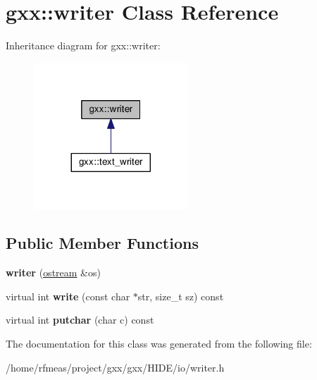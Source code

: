 \hypertarget{classgxx_1_1writer}{}\section{gxx\+:\+:writer Class Reference}
\label{classgxx_1_1writer}


Inheritance diagram for gxx\+:\+:writer\+:
\nopagebreak
\begin{figure}[H]
\begin{center}
\leavevmode
\includegraphics[width=164pt]{classgxx_1_1writer__inherit__graph}
\end{center}
\end{figure}
\subsection*{Public Member Functions}
\begin{DoxyCompactItemize}
\item 
{\bfseries writer} (\hyperlink{classgxx_1_1ostream}{ostream} \&os)\hypertarget{classgxx_1_1writer_a60edbdc7b75f794de2eb30adb062b4cf}{}\label{classgxx_1_1writer_a60edbdc7b75f794de2eb30adb062b4cf}

\item 
virtual int {\bfseries write} (const char $\ast$str, size\+\_\+t sz) const \hypertarget{classgxx_1_1writer_a226530dc179679e516823aaea77cecee}{}\label{classgxx_1_1writer_a226530dc179679e516823aaea77cecee}

\item 
virtual int {\bfseries putchar} (char c) const \hypertarget{classgxx_1_1writer_ae8ac28e843c0ad896041a8a512cae9dd}{}\label{classgxx_1_1writer_ae8ac28e843c0ad896041a8a512cae9dd}

\end{DoxyCompactItemize}


The documentation for this class was generated from the following file\+:\begin{DoxyCompactItemize}
\item 
/home/rfmeas/project/gxx/gxx/\+H\+I\+D\+E/io/writer.\+h\end{DoxyCompactItemize}
